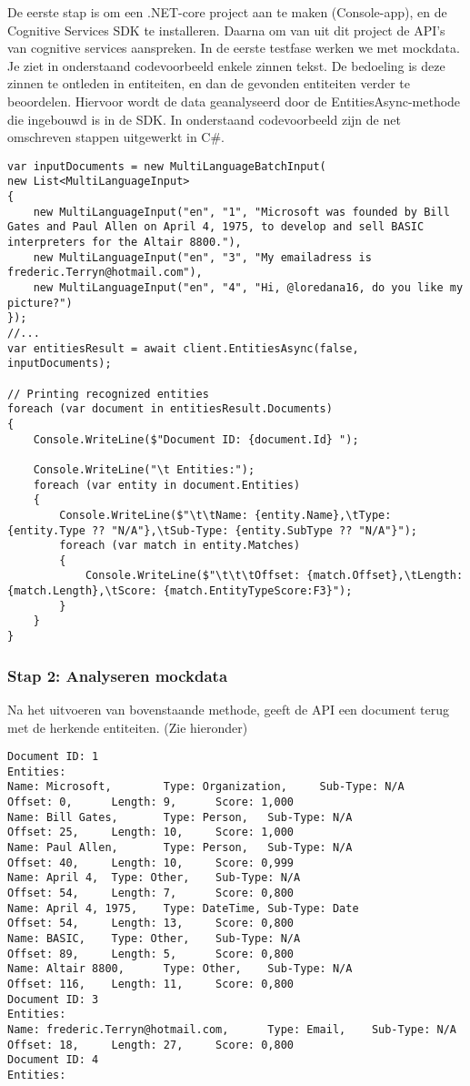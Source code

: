 De eerste stap is om een .NET-core project aan te maken (Console-app), en de Cognitive Services SDK te installeren.  
Daarna om van uit dit project  de API's van cognitive services aanspreken. In de eerste testfase werken we met mockdata. Je ziet in onderstaand codevoorbeeld enkele zinnen tekst. De bedoeling is deze zinnen te ontleden in entiteiten, en dan de gevonden entiteiten verder te beoordelen. 
Hiervoor wordt de data geanalyseerd door de EntitiesAsync-methode die ingebouwd is in de SDK. In onderstaand codevoorbeeld zijn de net omschreven stappen uitgewerkt in C\#. 

\begin{lstlisting}[frame=single]
var inputDocuments = new MultiLanguageBatchInput(
new List<MultiLanguageInput>
{
	new MultiLanguageInput("en", "1", "Microsoft was founded by Bill Gates and Paul Allen on April 4, 1975, to develop and sell BASIC interpreters for the Altair 8800."),
	new MultiLanguageInput("en", "3", "My emailadress is frederic.Terryn@hotmail.com"), 
	new MultiLanguageInput("en", "4", "Hi, @loredana16, do you like my picture?")
});
//...
var entitiesResult = await client.EntitiesAsync(false, inputDocuments);

// Printing recognized entities
foreach (var document in entitiesResult.Documents)
{
	Console.WriteLine($"Document ID: {document.Id} ");
	
	Console.WriteLine("\t Entities:");
	foreach (var entity in document.Entities)
	{
		Console.WriteLine($"\t\tName: {entity.Name},\tType: {entity.Type ?? "N/A"},\tSub-Type: {entity.SubType ?? "N/A"}");
		foreach (var match in entity.Matches)
		{
			Console.WriteLine($"\t\t\tOffset: {match.Offset},\tLength: {match.Length},\tScore: {match.EntityTypeScore:F3}");
		}
	}
}
\end{lstlisting}

\subsubsection{Stap 2: Analyseren mockdata}

Na het uitvoeren van bovenstaande methode, geeft de API een document terug met de herkende entiteiten. (Zie hieronder)
\begin{lstlisting}[frame=single]
Document ID: 1
Entities:
Name: Microsoft,        Type: Organization,     Sub-Type: N/A
Offset: 0,      Length: 9,      Score: 1,000
Name: Bill Gates,       Type: Person,   Sub-Type: N/A
Offset: 25,     Length: 10,     Score: 1,000
Name: Paul Allen,       Type: Person,   Sub-Type: N/A
Offset: 40,     Length: 10,     Score: 0,999
Name: April 4,  Type: Other,    Sub-Type: N/A
Offset: 54,     Length: 7,      Score: 0,800
Name: April 4, 1975,    Type: DateTime, Sub-Type: Date
Offset: 54,     Length: 13,     Score: 0,800
Name: BASIC,    Type: Other,    Sub-Type: N/A
Offset: 89,     Length: 5,      Score: 0,800
Name: Altair 8800,      Type: Other,    Sub-Type: N/A
Offset: 116,    Length: 11,     Score: 0,800
Document ID: 3
Entities:
Name: frederic.Terryn@hotmail.com,      Type: Email,    Sub-Type: N/A
Offset: 18,     Length: 27,     Score: 0,800
Document ID: 4
Entities:
\end{lstlisting}

